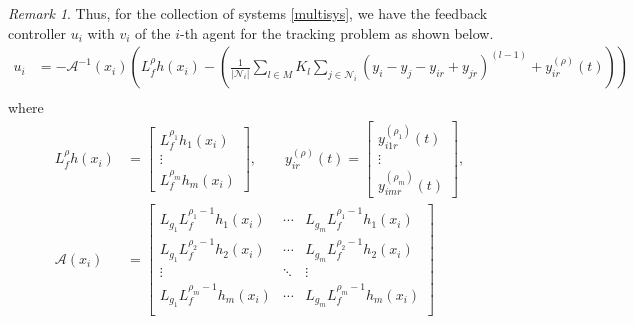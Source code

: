 \documentclass[11pt, a4paper, oneside, openany, reqno]{book}
\theoremstyle{definition}
\theoremstyle{remark}
\newtheorem{remark}[theorem]{Remark}
\numberwithin{equation}{chapter} %
\newcommand{\A}{\mathcal{A}}
\newcommand{\NBR}{\mathcal{N}}
\begin{document}
\begin{remark}
	Thus, for the collection of systems \eqref{multisys}, 
	we have the feedback controller $ u_i $ with $ v_i $ of the $ i $-th agent
	for the tracking problem as shown below.
	\begin{equation}\begin{split}\label{ctrlui}
		u_i 
		&= -\A^{-1}(x_i) \left( L_f^\rho h(x_i)			
		    - \left( \frac{1}{\vert \NBR_i \vert} \sum_{l \in M}
				K_{l}  \sum_{j \in \NBR_i } (y_i - y_j -  y_{ir} + y_{jr}) ^{(l-1)}  
				+  y_{ir}^{(\rho)}(t) \right)\right)\\			
	\end{split}\end{equation} 	
	where
	\begin{equation}\begin{split}
		L_f^\rho h(x_i) &= \left[ 
		\begin{array}{c } L_f^{\rho_1}h_1(x_i) \\ \vdots \\ L_f^{\rho_m}h_m(x_i) \end{array} \right],
		\qquad y_{ir}^{(\rho)}(t) = \left[  \begin{array}{c } y_{i1r}^{(\rho_1)} (t) \\
				\vdots \\	y_{imr}^{(\rho_m)} (t) \end{array}	   \right], \\
		\A (x_i)&=\left[\begin{array}{ccc}
		L_{g_1} L_f^{\rho_1 -1} h_1 (x_i) & \cdots & L_{g_m} L_f^{\rho_1 -1} h_1 (x_i)\\
		L_{g_1} L_f^{\rho_2 -1} h_2 (x_i) & \cdots & L_{g_m} L_f^{\rho_2 -1} h_2 (x_i)\\
		\vdots & \ddots & \vdots\\
		L_{g_1} L_f^{\rho_m -1} h_m (x_i) & \cdots & L_{g_m} L_f^{\rho_m -1} h_m (x_i)\\\end{array}\right] \\
	\end{split}\end{equation}
\end{remark}	
\end{document}
